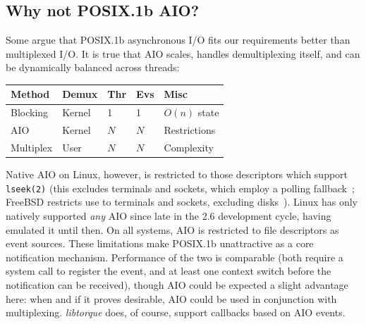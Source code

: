 \documentclass[letterpaper,10pt]{article}
\makeatletter
\newenvironment{tablehere}
{\def\@captype{table}}
{}
\makeatother
\begin{document}
\begin{multicols}{2}
\subsection{Why not POSIX.1b AIO?}
Some argue that POSIX.1b asynchronous I/O fits our requirements better than
multiplexed I/O. It is true that AIO scales, handles demultiplexing itself,
and can be dynamically balanced across threads:
\begin{center}\begin{tablehere}
	\begin{tabular}{| l || l | l | l | l | }
	\hline
	Method & Demux & Thr & Evs & Misc  \\ \hline \hline
	Blocking & Kernel & 1 & 1 & $O(n)$ state \\ \hline
	AIO & Kernel & $N$ & $N$ & Restrictions \\ \hline
	Multiplex & User & $N$ & $N$ & Complexity \\ \hline
	\end{tabular}
\end{tablehere}\end{center}
Native AIO on Linux, however, is restricted to those descriptors which
support \texttt{lseek(2)} (this excludes terminals and sockets, which employ
a polling fallback~\cite{Bhattacharya07}; FreeBSD restricts use to terminals
and sockets, excluding disks~\cite{Stevens08}). Linux has only natively supported
\textit{any} AIO since late in the 2.6 development cycle, having emulated it until
then. On all systems, AIO is restricted to file descriptors as event sources.
These limitations make POSIX.1b unattractive as a core notification mechanism.
Performance of the two is comparable (both require a system call to register
the event, and at least one context switch before the notification can be
received), though AIO could be expected a slight advantage here: when and if
it proves desirable, AIO could be used in conjunction with multiplexing.
\textit{libtorque} does, of course, support callbacks based on AIO events.

\end{multicols}
\end{document}
